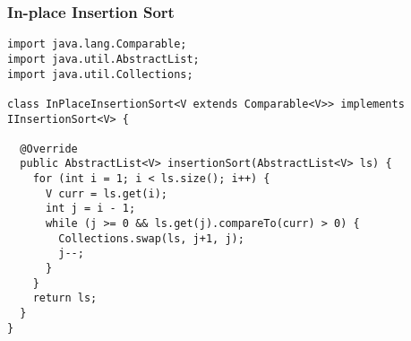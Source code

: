 \newpage %
\subsubsection*{In-place Insertion Sort}
\begin{lstlisting}[language=MyJava]
import java.lang.Comparable;
import java.util.AbstractList;
import java.util.Collections;

class InPlaceInsertionSort<V extends Comparable<V>> implements IInsertionSort<V> {

  @Override
  public AbstractList<V> insertionSort(AbstractList<V> ls) {
    for (int i = 1; i < ls.size(); i++) {
      V curr = ls.get(i);
      int j = i - 1;
      while (j >= 0 && ls.get(j).compareTo(curr) > 0) {
        Collections.swap(ls, j+1, j);
        j--;
      }
    }
    return ls;
  }
}
\end{lstlisting}

